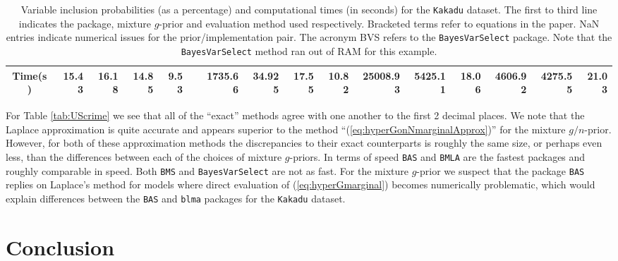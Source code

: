 \begin{sidewaystable}[h!]
\begin{center}
{\begin{tabular}{c|r|r|rrrrrr|rrrr|rrr}
				Time(s) & 15.43 & 16.18 & 14.85  &  9.53   &       & 1735.66  & 34.925  &   17.55 &  10.82         &  25008.93 & 
				5425.11  &   18.06   & 4606.92       &  4275.55  & 21.03  \\ 
				\hline
			\end{tabular}
		}
	\end{center}
	\caption{Variable inclusion probabilities (as a percentage) and computational times (in seconds) for the {\tt Kakadu} dataset.
		The first to third line indicates the package, mixture $g$-prior and evaluation method used respectively. Bracketed terms
		refer to equations in the paper. NaN entries indicate numerical issues for the prior/implementation pair. The acronym BVS refers to the {\tt BayesVarSelect} package. Note that 
		the {\tt BayesVarSelect} method ran out of RAM for this example.}
	\label{tab:Kakadu}
\end{sidewaystable}


For Table \ref{tab:UScrime} we see that all of the ``exact'' methods agree with one another to the first 2 decimal 
places. We note that the Laplace approximation is quite accurate and appears superior to  the method
``(\ref{eq:hyperGonNmarginalApprox})'' for the mixture $g/n$-prior. However, for both of these approximation
methods the discrepancies to their exact counterparts is roughly the same size, or perhaps even less, than
the differences between each of the choices of mixture $g$-priors. In terms of speed {\tt BAS} and {\tt BMLA} are
the fastest packages and roughly comparable in speed. Both {\tt BMS} and {\tt BayesVarSelect} are not as fast.
For the mixture $g$-prior we suspect that the package {\tt BAS} replies on Laplace's method for models
where direct evaluation of (\ref{eq:hyperGmarginal}) becomes numerically problematic, which would explain
differences between the {\tt BAS} and {\tt blma} packages for the {\tt Kakadu} dataset.

\section{Conclusion}
\label{sec:conclusion}

